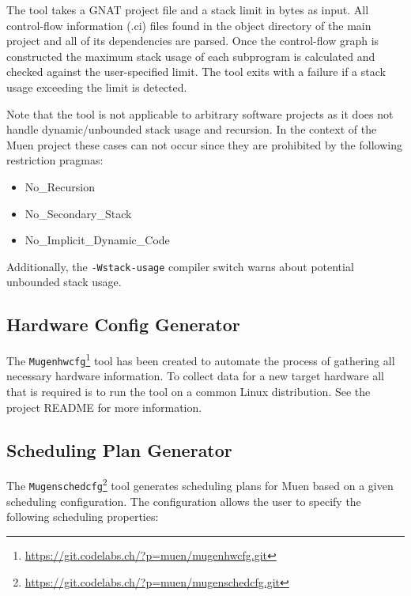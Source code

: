 \documentclass[a4paper,twoside,titlepage]{article}
\begin{document}
The tool takes a GNAT project file and a stack limit in bytes as input.  All
control-flow information (.ci) files found in the object directory of the main
project and all of its dependencies are parsed. Once the control-flow graph is
constructed the maximum stack usage of each subprogram is calculated and
checked against the user-specified limit. The tool exits with a failure if a
stack usage exceeding the limit is detected.

Note that the tool is not applicable to arbitrary software projects
as it does not handle dynamic/unbounded stack usage and recursion. In the
context of the Muen project these cases can not occur since they are prohibited
by the following restriction pragmas:
\begin{itemize}
	\item No\_Recursion
	\item No\_Secondary\_Stack
	\item No\_Implicit\_Dynamic\_Code
\end{itemize}

Additionally, the \texttt{-Wstack-usage} compiler switch warns about potential
unbounded stack usage.

\subsection{Hardware Config Generator}
\label{sec:mugenhwcfg}
The
\texttt{Mugenhwcfg}\footnote{\url{https://git.codelabs.ch/?p=muen/mugenhwcfg.git}}
tool has been created to automate the process of gathering all necessary
hardware information. To collect data for a new target hardware all that is
required is to run the tool on a common Linux distribution. See the project
README for more information.

\subsection{Scheduling Plan Generator}
\label{sec:mugenschedcfg}
The
\texttt{Mugenschedcfg}\footnote{\url{https://git.codelabs.ch/?p=muen/mugenschedcfg.git}}
tool generates scheduling plans for Muen based on a given scheduling
configuration.  The configuration allows the user to specify the following
scheduling properties:
\end{document}
